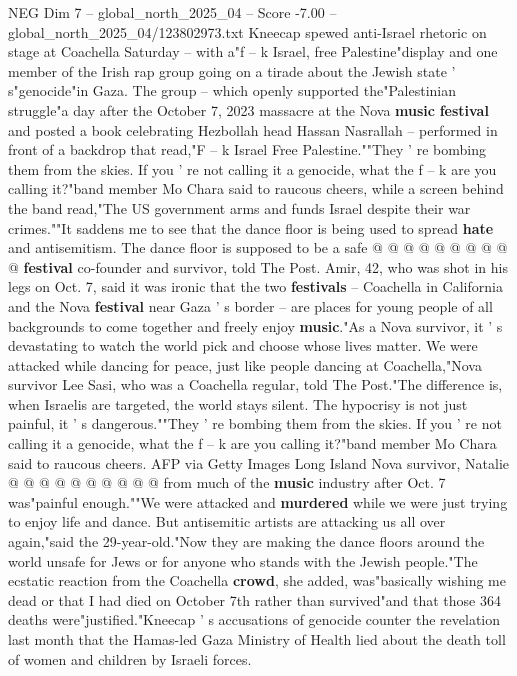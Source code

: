 \begin{textsample}{NEG Dim 7 – global\_north\_2025\_04 – Score -7.00 – global\_north\_2025\_04/123802973.txt}  \label{ex:f7_neg_096}
Kneecap spewed anti-Israel rhetoric on stage at Coachella Saturday -- with a"f -- k Israel, free Palestine"display and one member of the Irish rap group going on a tirade about the Jewish state ' s"genocide"in Gaza.
The group -- which openly supported the"Palestinian struggle"a day after the October 7, 2023 massacre at the Nova \textbf{music} \textbf{festival} and posted a book celebrating Hezbollah head Hassan Nasrallah -- performed in front of a backdrop that read,"F -- k Israel Free Palestine.""They ' re bombing them from the skies.
If you ' re not calling it a genocide, what the f -- k are you calling it?"band member Mo Chara said to raucous cheers, while a screen behind the band read,"The US government arms and funds Israel despite their war crimes.""It saddens me to see that the dance floor is being used to spread \textbf{hate} and antisemitism.
The dance floor is supposed to be a safe @ @ @ @ @ @ @ @ @ @ \textbf{festival} co-founder and survivor, told The Post.
Amir, 42, who was shot in his legs on Oct. 7, said it was ironic that the two \textbf{festivals} -- Coachella in California and the Nova \textbf{festival} near Gaza ' s border -- are places for young people of all backgrounds to come together and freely enjoy \textbf{music}."As a Nova survivor, it ' s devastating to watch the world pick and choose whose lives matter.
We were attacked while dancing for peace, just like people dancing at Coachella,"Nova survivor Lee Sasi, who was a Coachella regular, told The Post."The difference is, when Israelis are targeted, the world stays silent.
The hypocrisy is not just painful, it ' s dangerous.""They ' re bombing them from the skies.
If you ' re not calling it a genocide, what the f -- k are you calling it?"band member Mo Chara said to raucous cheers.
AFP via Getty Images Long Island Nova survivor, Natalie @ @ @ @ @ @ @ @ @ @ from much of the \textbf{music} industry after Oct. 7 was"painful enough.""We were attacked and \textbf{murdered} while we were just trying to enjoy life and dance.
But antisemitic artists are attacking us all over again,"said the 29-year-old."Now they are making the dance floors around the world unsafe for Jews or for anyone who stands with the Jewish people."The ecstatic reaction from the Coachella \textbf{crowd}, she added, was"basically wishing me dead or that I had died on October 7th rather than survived"and that those 364 deaths were"justified."Kneecap ' s accusations of genocide counter the revelation last month that the Hamas-led Gaza Ministry of Health lied about the death toll of women and children by Israeli forces.

\end{textsample}
